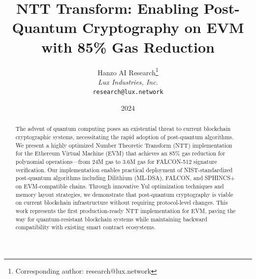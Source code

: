 \documentclass[11pt,a4paper]{article}
\title{NTT Transform: Enabling Post-Quantum Cryptography on EVM\\with 85\% Gas Reduction}
\author{
Hanzo AI Research\thanks{Corresponding author: research@lux.network}\\
\textit{Lux Industries, Inc.}\\
\texttt{research@lux.network}
}
\date{2024}
\begin{document}
\hanzocoverpage

\begin{abstract}
The advent of quantum computing poses an existential threat to current blockchain cryptographic systems, necessitating the rapid adoption of post-quantum algorithms. We present a highly optimized Number Theoretic Transform (NTT) implementation for the Ethereum Virtual Machine (EVM) that achieves an 85\% gas reduction for polynomial operations—from 24M gas to 3.6M gas for FALCON-512 signature verification. Our implementation enables practical deployment of NIST-standardized post-quantum algorithms including Dilithium (ML-DSA), FALCON, and SPHINCS+ on EVM-compatible chains. Through innovative Yul optimization techniques and memory layout strategies, we demonstrate that post-quantum cryptography is viable on current blockchain infrastructure without requiring protocol-level changes. This work represents the first production-ready NTT implementation for EVM, paving the way for quantum-resistant blockchain systems while maintaining backward compatibility with existing smart contract ecosystems.
\end{abstract}















\end{document}

